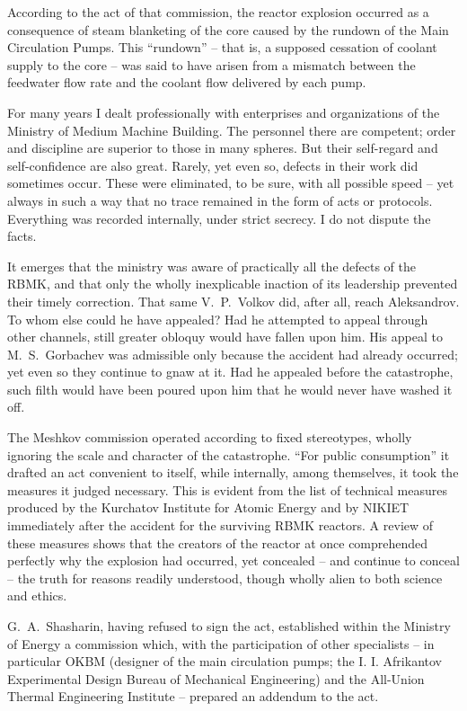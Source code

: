 \documentclass[openright]{bookest}
\begin{document}
According to the act of that commission, the reactor explosion occurred as a consequence of steam blanketing of the core caused by the rundown of the Main Circulation Pumps. This ``rundown'' -- that is, a supposed cessation of coolant supply to the core -- was said to have arisen from a mismatch between the feedwater flow rate and the coolant flow delivered by each pump.

For many years I dealt professionally with enterprises and organizations of the Ministry of Medium Machine Building. The personnel there are competent; order and discipline are superior to those in many spheres. But their self-regard and self-confidence are also great. Rarely, yet even so, defects in their work did sometimes occur. These were eliminated, to be sure, with all possible speed -- yet always in such a way that no trace remained in the form of acts or protocols. Everything was recorded internally, under strict secrecy. I do not dispute the facts.

It emerges that the ministry was aware of practically all the defects of the RBMK, and that only the wholly inexplicable inaction of its leadership prevented their timely correction. That same V.~P.~Volkov did, after all, reach Aleksandrov. To whom else could he have appealed? Had he attempted to appeal through other channels, still greater obloquy would have fallen upon him. His appeal to M.~S.~Gorbachev was admissible only because the accident had already occurred; yet even so they continue to gnaw at it. Had he appealed before the catastrophe, such filth would have been poured upon him that he would never have washed it off.

The Meshkov commission operated according to fixed stereotypes, wholly ignoring the scale and character of the catastrophe. ``For public consumption'' it drafted an act convenient to itself, while internally, among themselves, it took the measures it judged necessary. This is evident from the list of technical measures produced by the Kurchatov Institute for Atomic Energy and by NIKIET immediately after the accident for the surviving RBMK reactors. A review of these measures shows that the creators of the reactor at once comprehended perfectly why the explosion had occurred, yet concealed -- and continue to conceal -- the truth for reasons readily understood, though wholly alien to both science and ethics.

G.~A.~Shasharin, having refused to sign the act, established within the Ministry of Energy a commission which, with the participation of other specialists -- in particular OKBM (designer of the main circulation pumps; the I. I. Afrikantov Experimental Design Bureau of Mechanical Engineering) and the All-Union Thermal Engineering Institute -- prepared an addendum to the act.
\end{document}
